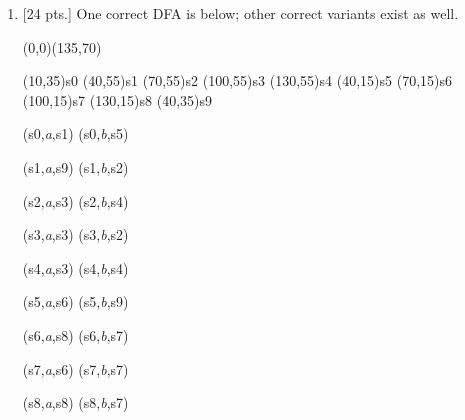 \documentclass[11pt,fleqn]{article}
\begin{document}
\begin{enumerate}
    \item {[24 pts.]} One correct DFA is below; other correct variants exist
          as well.

          \medskip

          \begin{automaton}(0,0)(135,70)

            \state[start](10,35){s0}
            \state(40,55){s1}
            \state[final](70,55){s2}
            \state(100,55){s3}
            \state(130,55){s4}
            \state(40,15){s5}
            \state[final](70,15){s6}
            \state(100,15){s7}
            \state(130,15){s8}
            \state[label={\renewcommand{\arraystretch}{.75}%
                          \normalsize%
                          \begin{tabular}[t]{c}%
                            dead%
                              \\%
                            state%
                          \end{tabular}}%
                  ](40,35){s9}

            \transition(s0,\emph{a},s1)
            \transition[labellocation=below](s0,\emph{b},s5)

            \transition[labellocation=below,labelposition=.4]%
                        (s1,\emph{a},s9)
            \transition[offset=2](s1,\emph{b},s2)

            \transition[offset=2](s2,\emph{a},s3)
            \transition[curved](s2,\emph{b},s4)

            \transition[loopdirection=down](s3,\emph{a},s3)
            \transition[offset=2](s3,\emph{b},s2)

            \transition%
                       (s4,\emph{a},s3)
            \transition[loopdirection=down](s4,\emph{b},s4)

            \transition(s5,\emph{a},s6)
            \transition[labelposition=.4](s5,\emph{b},s9)

            \transition[curved,angle=-35,labellocation=below](s6,\emph{a},s8)
            \transition[offset=2](s6,\emph{b},s7)

            \transition[offset=2](s7,\emph{a},s6)
            \transition[loopdirection=up](s7,\emph{b},s7)

            \transition[loopdirection=up](s8,\emph{a},s8)
            \transition%
                        (s8,\emph{b},s7)


\end{automaton}
\end{enumerate}
\end{document}
